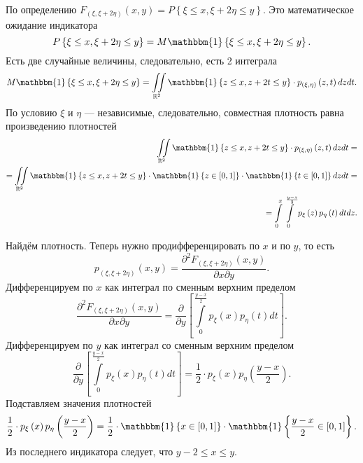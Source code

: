 \begin{enumerate}[label=\alph*)]
  По определению
  $F_{ \left( \xi, \xi + 2 \eta \right) } \left( x, y \right) =
    P \left\{ \xi \leq x, \xi + 2 \eta \leq y \right\} $.
  Это математическое ожидание индикатора
  $$P \left\{ \xi \leq x, \xi + 2 \eta \leq y \right\} =
    M \mathbbm{1} \left\{ \xi \leq x, \xi + 2 \eta \leq y \right\}.$$
  Есть две случайные величины, следовательно, есть 2 интеграла
  $$M \mathbbm{1} \left\{ \xi \leq x, \xi + 2 \eta \leq y \right\} =
    \iint \limits_{ \mathbb{R}^2}
      \mathbbm{1} \left\{ z \leq x, z + 2t \leq y \right\} \cdot
      p_{ \left( \xi, \eta \right) } \left( z, t \right)
    dzdt.$$
  По условию $ \xi $ и $ \eta $ --- независимые, следовательно,
  совместная плотность равна произведению плотностей
  \begin{equation*}
    \begin{split}
      \iint \limits_{ \mathbb{R}^2}
        \mathbbm{1} \left\{ z \leq x, z + 2t \leq y \right\} \cdot
        p_{ \left( \xi, \eta \right) } \left( z, t \right)
      dzdt = \\
      = \iint \limits_{ \mathbb{R}^2}
        \mathbbm{1} \left\{ z \leq x, z + 2t \leq y \right\} \cdot
        \mathbbm{1} \left\{ z \in \left[ 0, 1 \right] \right\} \cdot
        \mathbbm{1} \left\{ t \in \left[ 0, 1 \right] \right\}
      dzdt = \\
      = \int \limits_0^x
        \int \limits_0^{ \frac{y - z}{2}} p_{ \xi } \left( z \right) p_{ \eta } \left( t \right) dt
      dz.
    \end{split}
  \end{equation*}

  Найдём плотность.
  Теперь нужно продифференцировать по $x$ и по $y$, то есть
  $$p_{ \left( \xi, \xi + 2 \eta \right) } \left( x, y \right) =
    \frac{ \partial^2 F_{ \left( \xi, \xi + 2 \eta \right) } \left( x, y \right) }{ \partial x \partial y}.$$
  Дифференцируем по $x$ как интеграл по сменным верхним пределом
  $$ \frac{ \partial^2 F_{ \left( \xi, \xi + 2 \eta \right) } \left( x, y \right) }{ \partial x \partial y} =
    \frac{ \partial }{ \partial y} \left[
      \int \limits_0^{ \frac{y - x}{2}} p_{ \xi } \left( x \right) p_{ \eta } \left( t \right) dt
    \right].$$
  Дифференцируем по $y$ как интеграл со сменным верхним пределом
  $$ \frac{ \partial }{ \partial y} \left[
      \int \limits_0^{ \frac{y - x}{2}} p_{ \xi } \left( x \right) p_{ \eta } \left( t \right) dt
    \right] =
    \frac{1}{2} \cdot p_{ \xi } \left( x \right) p_{ \eta } \left( \frac{y - x}{2} \right).$$
  Подставляем значения плотностей
  $$ \frac{1}{2} \cdot p_{ \xi } \left( x \right) p_{ \eta } \left( \frac{y - x}{2} \right) =
    \frac{1}{2} \cdot
    \mathbbm{1} \left\{ x \in \left[ 0, 1 \right] \right\} \cdot
    \mathbbm{1} \left\{ \frac{y - x}{2} \in \left[ 0, 1 \right] \right\}.$$
  Из последнего индикатора следует, что $y - 2 \leq x \leq y$.


\end{enumerate}
